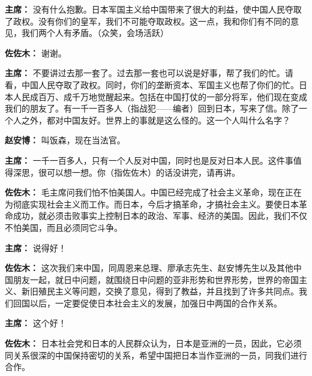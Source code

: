 \begin{duihua}
\item[\textbf{主席：}] 没有什么抱歉。日本军国主义给中国带来了很大的利益，使中国人民夺取了政权。没有你们的皇军，我们不可能夺取政权。这一点，我和你们有不同的意见，我们两个人有矛盾。（众笑，会场活跃）

\item[\textbf{佐佐木：}] 谢谢。

\item[\textbf{主席：}] 不要讲过去那一套了。过去那一套也可以说是好事，帮了我们的忙。请看，中国人民夺取了政权。同时，你们的垄断资本、军国主义也帮了你们的忙。日本人民成百万、成千万地觉醒起来。包括在中国打仗的一部分将军，他们现在变成我们的朋友了。有一千一百多人（指战犯——编者）回到日本，写来了信。除了一个人之外，都对中国友好。世界上的事就是这么怪的。这一个人叫什么名字？

\item[\textbf{赵安博：}] 叫饭森，现在当法官。

\item[\textbf{主席：}] 一千一百多人，只有一个人反对中国，同时也是反对日本人民。这件事值得深思，很可以想一想。你（指佐佐木）的话没讲完，请再讲。

\item[\textbf{佐佐木：}] 毛主席问我们怕不怕美国人。中国已经完成了社会主义革命，现在正在为彻底实现社会主义而工作。而日本，今后才搞革命，才搞社会主义。要使日本革命成功，就必须击败事实上控制日本的政治、军事、经济的美国。因此，我们不仅不怕美国，而且必须同它斗争。

\item[\textbf{主席：}] 说得好！

\item[\textbf{佐佐木：}] 这次我们来中国，同周恩来总理、廖承志先生、赵安博先生以及其他中国朋友一起，就日中问题，就围绕日中问题的亚非形势和世界形势，世界的帝国主义、新旧殖民主义等问题，交换了意见，得到了教益，并且找到了许多共同点。我们回国以后，一定要促使日本社会主义的发展，加强日中两国的合作关系。

\item[\textbf{主席：}] 这个好！

\item[\textbf{佐佐木：}] 日本社会党和日本的人民群众认为，日本是亚洲的一员，因此，它必须同关系很深的中国保持密切的关系，希望中国把日本当作亚洲的一员，同我们进行合作。


\end{duihua}
